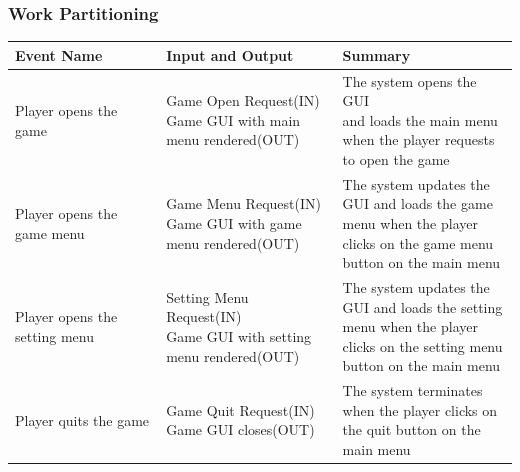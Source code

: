 \documentclass[12pt, titlepage]{article}
\begin{document}
\subsubsection{Work Partitioning}
\FloatBarrier
\begin{center}
\begin{longtable}[!bpht]{|m{0.3\linewidth}|m{0.35\linewidth}|m{0.35\linewidth}|}\hline
\textbf{Event Name} & \textbf{Input and Output} & \textbf{Summary}\\\hline
Player opens the game & \makecell[ml]{Game Open Request(IN) \\ Game GUI with main\\ menu rendered(OUT)} & \makecell[ml]{The system opens the GUI\\ and loads the main menu\\ when the player requests\\ to open the game}\\\hline

Player opens the game menu & \makecell[ml]{Game Menu Request(IN)\\ Game GUI with game\\ menu rendered(OUT)} & \makecell[ml]{The system updates the\\ GUI and loads the game\\ menu when the player\\ clicks on the game menu\\ button on the main menu}\\\hline

\makecell[ml]{Player opens the\\ setting menu} & \makecell[ml]{Setting Menu Request(IN)\\ Game GUI with setting\\ menu rendered(OUT)} & \makecell[ml]{The system updates the\\ GUI and loads the setting\\ menu when the player\\ clicks on the setting menu\\ button on the main menu}\\\hline

Player quits the game & \makecell[ml]{Game Quit Request(IN)\\ Game GUI closes(OUT)} & \makecell[ml]{The system terminates\\ when the player clicks on\\ the quit button on the\\ main menu}\\\hline


\end{longtable}
\end{center}
\end{document}
